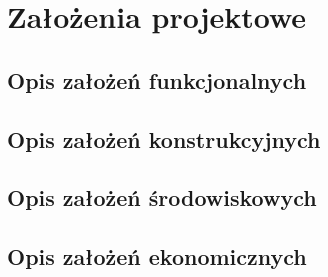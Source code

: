 \chapter{Założenia projektowe}
    \section{Opis założeń funkcjonalnych}
    \section{Opis założeń konstrukcyjnych}
    \section{Opis założeń środowiskowych}
    \section{Opis założeń ekonomicznych}